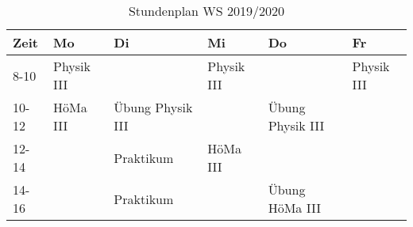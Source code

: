 \documentclass[
  captions=tableheading,
]{scrartcl}
\begin{document}
\renewcommand{\arraystretch}{2}
\begin{table}
\centering
\caption {Stundenplan WS 2019/2020}
    \begin{tabular}{p{2cm} p{2cm} p{2cm} p{2cm} p{2cm} p{2cm}}
    \toprule
    Zeit & Mo & Di & Mi & Do & Fr \\
    \midrule
    8-10 & Physik III & & Physik III & & Physik III \\
    10-12 & HöMa III & Übung Physik III & & Übung Physik III & \\
    12-14 & & Praktikum & HöMa III \\
    14-16 & & Praktikum & & Übung \-HöMa III \\
    \bottomrule
    \end{tabular}
\end{table}
\end{document}
